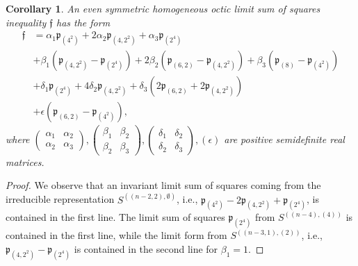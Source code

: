 \documentclass[11pt,a4paper]{amsart}
\numberwithin{equation}{section}
\newtheorem{cor}[thm]{Corollary}
\theoremstyle{definition}
\numberwithin{thm}{section}
\theoremstyle{break}
\numberwithin{subcase}{case}
\begin{document}
\begin{cor} \label{COR Limit Octics}
An even symmetric homogeneous octic limit sum of squares inequality $\mathfrak{f}$ has the form
\begin{align*}
    \mathfrak{f} & = \alpha_1 \mathfrak{p}_{(4^2)} + 2 \alpha_2 \mathfrak{p}_{(4,2^2)}+ \alpha_3 \mathfrak{p}_{(2^4)}\\
    & + \beta_1 (\mathfrak{p}_{(4,2^2)}-\mathfrak{p}_{(2^4)})+2\beta_2 (\mathfrak{p}_{(6,2)}-\mathfrak{p}_{(4,2^2)})+\beta_3 (\mathfrak{p}_{(8)}-\mathfrak{p}_{(4^2)}) \\
    & + \delta_1 \mathfrak{p}_{(2^4)}+4\delta_2 \mathfrak{p}_{(4,2^2)}+ \delta_3 (2\mathfrak{p}_{(6,2)} + 2\mathfrak{p}_{(4,2^2)}) \\ 
    & + \epsilon (\mathfrak{p}_{(6,2)}-\mathfrak{p}_{(4^2)}), 
\end{align*}
where $\left( \begin{array}{cc} \alpha_1 & \alpha_2 \\ \alpha_2 & \alpha_3 \end{array}\right), \left( \begin{array}{cc} \beta_1 & \beta_2 \\ \beta_2 & \beta_3 \end{array}\right), \left( \begin{array}{cc} \delta_1 & \delta_2 \\ \delta_2 & \delta_3 \end{array}\right), \left( \epsilon \right)$ are positive semidefinite real matrices. 
\end{cor}
\begin{proof}
We observe that an invariant limit sum of squares coming from the irreducible representation $S^{((n-2,2),\emptyset)}$, i.e., $\mathfrak{p}_{(4^2)}-2\mathfrak{p}_{(4,2^2)}+\mathfrak{p}_{(2^4)}$, is contained in the first line.
The limit sum of squares $\mathfrak{p}_{(2^4)}$ from $S^{((n-4),(4))}$ is contained in the first line, while the limit form from $S^{((n-3,1),(2))}$, i.e., $\mathfrak{p}_{(4,2^2)}-\mathfrak{p}_{(2^4)}$ is contained in the second line for $\beta_1 = 1.$
\end{proof}
\end{document}

